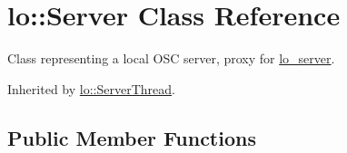 \hypertarget{classlo_1_1Server}{\section{lo\+:\+:Server Class Reference}
\label{classlo_1_1Server}
}


Class representing a local O\+S\+C server, proxy for \hyperlink{lo__types_8h_a59067bf50cf8abb4371da6f03c9036c9}{lo\+\_\+server}.  




Inherited by \hyperlink{classlo_1_1ServerThread}{lo\+::\+Server\+Thread}.

\subsection*{Public Member Functions}
